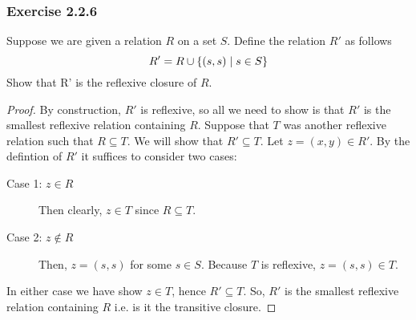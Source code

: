 

\titlespacing{\subsubsection}{0pt}{\parskip}{-\parskip}



\subsubsection*{Exercise 2.2.6}
Suppose we are given a relation $R$ on a set $S$. Define the relation $R'$ as follows 
\[
    R' = R \cup \{(s, s)\mid s \in S\}
\]
Show that R' is the reflexive closure of $R$.
\begin{proof}
    By construction, $R'$ is reflexive, so all we need to show is that $R'$ is the smallest reflexive
    relation containing $R$.  Suppose that $T$ was another reflexive relation such that $R \subseteq T$.
    We will show that $R' \subseteq T$.  Let $z = (x, y) \in R'$.  By the defintion of $R'$ it suffices to  consider two cases:
    \begin{description}
        \item[Case 1: $z \in R$] Then clearly, $z \in T$ since $R \subseteq T$.
        \item[Case 2: $z \notin R$] Then, $z = (s, s)$ for some $s \in S$.  Because $T$ is reflexive, $z = (s, s) \in T$.  
    \end{description}

    In either case we have show $z \in T$, hence $R' \subseteq T$. So, $R'$ is the smallest reflexive relation containing $R$ i.e. is it the transitive closure.
\end{proof}


